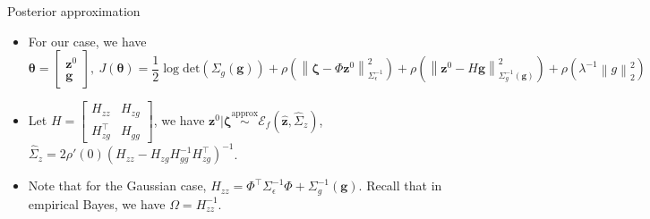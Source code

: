 \documentclass[smaller,aspectratio=169]{beamer}        %
\newcommand{\norm}[1]{\left\lVert#1\right\rVert}
\newcommand{\dett}[1]{\mathrm{det}\left(#1\right)}
\newcommand{\ellip}[1]{\mathcal{E}_f\left(#1\right)}
\begin{document}
\begin{frame}{Posterior approximation}
    \begin{itemize}
        \setlength\itemsep{1em}
        \item For our case, we have
        \[\boldsymbol{\theta}=\begin{bmatrix}
            \mathbf{z}^0\\\mathbf{g}
        \end{bmatrix},\  J(\boldsymbol{\theta})=\frac12\log\dett{\Sigma_g(\mathbf{g})}+\rho\left(\norm{\boldsymbol{\zeta}-\Phi\mathbf{z}^0}_{\Sigma_\epsilon^{-1}}^2\right)+\rho\left(\norm{\mathbf{z}^0-H\mathbf{g}}_{\Sigma_g^{-1}(\mathbf{g})}^2\right)+\rho\left(\lambda^{-1}\norm{g}_2^2\right)\]
        \item Let $H=\begin{bmatrix}
            H_{zz}&H_{zg}\\
            H_{zg}^\top&H_{gg}
        \end{bmatrix}$, we have $\mathbf{z}^0|\boldsymbol{\zeta}\overset{\text{approx}}{\sim}\ellip{\hat{\mathbf{z}},\hat{\Sigma}_z}$, $\hat{\Sigma}_z=2\rho'(0)\left(H_{zz}-H_{zg}H_{gg}^{-1}H_{zg}^\top\right)^{-1}$.
        \item Note that for the Gaussian case, $H_{zz}=\Phi^\top\Sigma_\epsilon^{-1}\Phi+\Sigma_g^{-1}(\mathbf{g})$. Recall that in empirical Bayes, we have $\Omega=H_{zz}^{-1}$.
    \end{itemize}
\end{frame}
\end{document}
